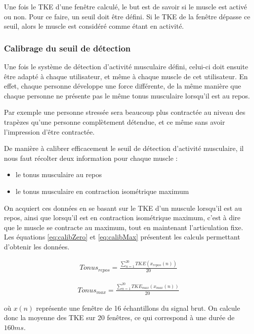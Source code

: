 \documentclass[letterpaper, twoside, 12pt, memoire, creativecommons, hyperref]{thETS}
\begin{document}
Une fois le TKE d'une fenêtre calculé, le but est de savoir si le muscle est activé ou non. Pour ce faire, un seuil doit être défini. Si le TKE de la fenêtre dépasse ce seuil, alors le muscle est considéré comme étant en activité.

\subsubsection{Calibrage du seuil de détection}

Une fois le système de détection d'activité musculaire défini, celui-ci doit ensuite être adapté à chaque utilisateur, et même à chaque muscle de cet utilisateur. En effet, chaque personne développe une force différente, de la même manière que chaque personne ne présente pas le même tonus musculaire lorsqu'il est au repos. 

Par exemple une personne stressée sera beaucoup plus contractée au niveau des trapèzes qu'une personne complètement détendue, et ce même sans avoir l'impression d'être contractée.

De manière à calibrer efficacement le seuil de détection d'activité musculaire, il nous faut récolter deux information pour chaque muscle : 

\begin{itemize}
 \item le tonus musculaire au repos
 \item le tonus musculaire en contraction isométrique maximum
\end{itemize}

On acquiert ces données en se basant sur le TKE d'un muscule lorsqu'il est au repos, ainsi que lorsqu'il est en contraction isométrique maximum, c'est à dire que le muscle se contracte au maximum, tout en maintenant l'articulation fixe. Les équations \ref{eq:calibZero} et \ref{eq:calibMax} présentent les calculs permettant d'obtenir les données.

\begin{align}\label{eq:calibZero}
   Tonus_{repos} = \frac{\sum_{n=1}^{20}TKE(x_{repos}(n))}{20} 
\end{align}

\begin{align}\label{eq:calibMax}
   Tonus_{max} = \frac{\sum_{n=1}^{20}TKE_{max}(x_{max}(n))}{20} 
\end{align}

où $x(n)$ représente une fenêtre de 16 échantillons du signal brut. On calcule donc la moyenne des TKE sur 20 fenêtres, ce qui correspond à une durée de $160ms$. 
\end{document}
